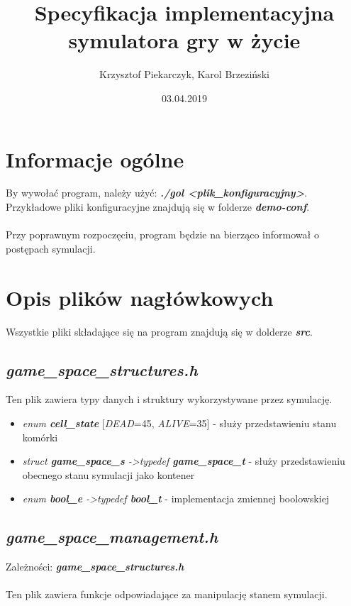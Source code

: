 \documentclass[12pt]{article}
\title{Specyfikacja implementacyjna symulatora gry w życie}
\author{Krzysztof Piekarczyk, Karol Brzeziński}
\date{03.04.2019}
\begin{document}
\maketitle


\section{Informacje ogólne}
By wywołać program, należy użyć: \textbf{\textit{./gol \textless plik\_konfiguracyjny\textgreater}}.
Przykładowe pliki konfiguracyjne znajdują się w folderze \textbf{\textit{demo-conf}}.\\
\\
Przy poprawnym rozpoczęciu, program będzie na bierząco informował o postępach symulacji.


\section{Opis plików nagłówkowych}
Wszystkie pliki składające się na program znajdują się w dolderze \textbf{\textit{src}}.

    \subsection{\textbf{\textit{game\_space\_structures.h}}}
        Ten plik zawiera typy danych i struktury wykorzystywane przez symulację.

        \begin{itemize}
            \item \textit{enum \textbf{cell\_state}} [\textit{DEAD}=45, \textit{ALIVE}=35] - służy przedstawieniu stanu komórki
            \item \textit{struct \textbf{game\_space\_s} -\textgreater typedef \textbf{game\_space\_t}} - służy przedstawieniu obecnego stanu symulacji jako kontener
            \item \textit{enum \textbf{bool\_e} -\textgreater typedef \textbf{bool\_t}} - implementacja zmiennej boolowskiej
        \end{itemize}


    \subsection{\textbf{\textit{game\_space\_management.h}}}
        Zależności: \textit{ \textbf{game\_space\_structures.h}}\\\\
        Ten plik zawiera funkcje odpowiadające za manipulację stanem symulacji.
\end{document}
